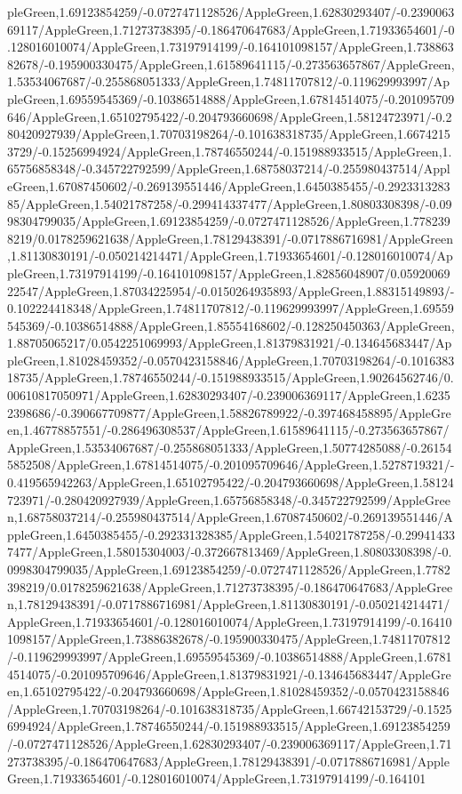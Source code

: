 {\begin{tikzternal}
{pleGreen,1.69123854259/-0.0727471128526/AppleGreen,1.62830293407/-0.239006369117/AppleGreen,1.71273738395/-0.186470647683/AppleGreen,1.71933654601/-0.128016010074/AppleGreen,1.73197914199/-0.164101098157/AppleGreen,1.73886382678/-0.195900330475/AppleGreen,1.61589641115/-0.273563657867/AppleGreen,1.53534067687/-0.255868051333/AppleGreen,1.74811707812/-0.119629993997/AppleGreen,1.69559545369/-0.10386514888/AppleGreen,1.67814514075/-0.201095709646/AppleGreen,1.65102795422/-0.204793660698/AppleGreen,1.58124723971/-0.280420927939/AppleGreen,1.70703198264/-0.101638318735/AppleGreen,1.66742153729/-0.15256994924/AppleGreen,1.78746550244/-0.151988933515/AppleGreen,1.65756858348/-0.345722792599/AppleGreen,1.68758037214/-0.255980437514/AppleGreen,1.67087450602/-0.269139551446/AppleGreen,1.6450385455/-0.292331328385/AppleGreen,1.54021787258/-0.299414337477/AppleGreen,1.80803308398/-0.0998304799035/AppleGreen,1.69123854259/-0.0727471128526/AppleGreen,1.7782398219/0.0178259621638/AppleGreen,1.78129438391/-0.0717886716981/AppleGreen,1.81130830191/-0.050214214471/AppleGreen,1.71933654601/-0.128016010074/AppleGreen,1.73197914199/-0.164101098157/AppleGreen,1.82856048907/0.0592006922547/AppleGreen,1.87034225954/-0.0150264935893/AppleGreen,1.88315149893/-0.102224418348/AppleGreen,1.74811707812/-0.119629993997/AppleGreen,1.69559545369/-0.10386514888/AppleGreen,1.85554168602/-0.128250450363/AppleGreen,1.88705065217/0.0542251069993/AppleGreen,1.81379831921/-0.134645683447/AppleGreen,1.81028459352/-0.0570423158846/AppleGreen,1.70703198264/-0.101638318735/AppleGreen,1.78746550244/-0.151988933515/AppleGreen,1.90264562746/0.00610817050971/AppleGreen,1.62830293407/-0.239006369117/AppleGreen,1.62352398686/-0.390667709877/AppleGreen,1.58826789922/-0.397468458895/AppleGreen,1.46778857551/-0.286496308537/AppleGreen,1.61589641115/-0.273563657867/AppleGreen,1.53534067687/-0.255868051333/AppleGreen,1.50774285088/-0.261545852508/AppleGreen,1.67814514075/-0.201095709646/AppleGreen,1.5278719321/-0.419565942263/AppleGreen,1.65102795422/-0.204793660698/AppleGreen,1.58124723971/-0.280420927939/AppleGreen,1.65756858348/-0.345722792599/AppleGreen,1.68758037214/-0.255980437514/AppleGreen,1.67087450602/-0.269139551446/AppleGreen,1.6450385455/-0.292331328385/AppleGreen,1.54021787258/-0.299414337477/AppleGreen,1.58015304003/-0.372667813469/AppleGreen,1.80803308398/-0.0998304799035/AppleGreen,1.69123854259/-0.0727471128526/AppleGreen,1.7782398219/0.0178259621638/AppleGreen,1.71273738395/-0.186470647683/AppleGreen,1.78129438391/-0.0717886716981/AppleGreen,1.81130830191/-0.050214214471/AppleGreen,1.71933654601/-0.128016010074/AppleGreen,1.73197914199/-0.164101098157/AppleGreen,1.73886382678/-0.195900330475/AppleGreen,1.74811707812/-0.119629993997/AppleGreen,1.69559545369/-0.10386514888/AppleGreen,1.67814514075/-0.201095709646/AppleGreen,1.81379831921/-0.134645683447/AppleGreen,1.65102795422/-0.204793660698/AppleGreen,1.81028459352/-0.0570423158846/AppleGreen,1.70703198264/-0.101638318735/AppleGreen,1.66742153729/-0.15256994924/AppleGreen,1.78746550244/-0.151988933515/AppleGreen,1.69123854259/-0.0727471128526/AppleGreen,1.62830293407/-0.239006369117/AppleGreen,1.71273738395/-0.186470647683/AppleGreen,1.78129438391/-0.0717886716981/AppleGreen,1.71933654601/-0.128016010074/AppleGreen,1.73197914199/-0.164101}
\end{tikzternal}}
